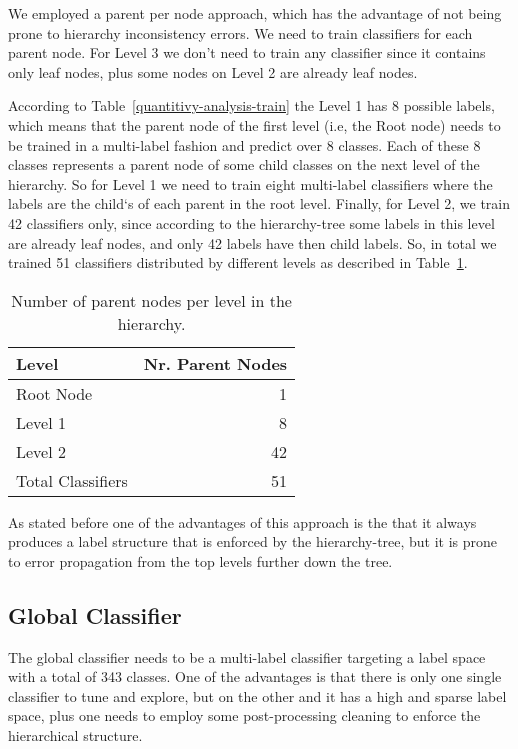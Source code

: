\documentclass[11pt,a4paper]{article}
\begin{document}
We employed a parent per node approach, which has the advantage of not being
prone to hierarchy inconsistency errors. We need to train classifiers for each
parent node. For Level 3 we don't need to train any classifier since it
contains only leaf nodes, plus some nodes on Level 2 are already leaf nodes.

According to Table~\ref{quantitivy-analysis-train} the Level 1 has 8 possible
labels, which means that the parent node of the first level (i.e, the Root node)
needs to be trained in a multi-label fashion and predict over 8 classes. Each of
these 8 classes represents a parent node of some child classes on the
next level of the hierarchy. So for Level 1 we need to train eight multi-label
classifiers where the labels are the child`s of each parent in the root level.
Finally, for Level 2, we train 42 classifiers only, since according to the
hierarchy-tree some labels in this level are already leaf nodes, and only 42
labels have then child labels. So, in total we trained 51 classifiers
distributed by different levels as described in Table~\ref{parent-per-node-classifiers}.

\begin{table}[!h]
\begin{center}
\begin{tabular}{|l|r|}
\hline\centering\textbf{Level}  &  \textbf{Nr. Parent Nodes}    \\
\hline
Root Node         &  1       \\
Level 1           &  8       \\
Level 2           &  42      \\
\hline
Total Classifiers & 51       \\
\hline
\end{tabular}
\end{center}
\caption{\label{parent-per-node-classifiers}Number of parent nodes per level in
the hierarchy.}
\end{table}

As stated before one of the advantages of this approach is the that it always
produces a label structure that is enforced by the hierarchy-tree, but it is
prone to error propagation from the top levels further down the tree.


\subsection{Global Classifier}

The global classifier needs to be a multi-label classifier targeting a label
space with a total of 343 classes. One of the advantages is that there is only
one single classifier to tune and explore, but on the other and it has a high
and sparse label space, plus one needs to employ some post-processing cleaning
to enforce the hierarchical structure.
\end{document}

